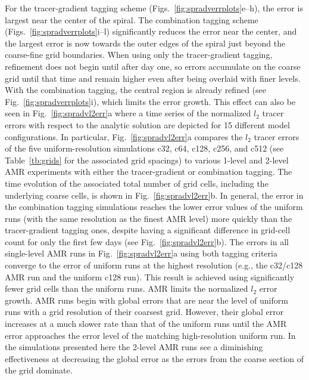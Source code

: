 %
For the tracer-gradient tagging scheme
(Figs.~\ref{fig:spradverrplots}e--h), the error is largest near the center of
the spiral. The combination tagging scheme
(Figs.~\ref{fig:spradverrplots}i--l) significantly reduces the error near the
center, and the largest error is now towards the outer edges of the
spiral just beyond the coarse-fine grid boundaries.  When using only the
tracer-gradient tagging, refinement does not begin until after day one,
so errors accumulate on the coarse grid until that time and remain
higher even after being overlaid with finer levels.  With the
combination tagging, the central region is already refined (see
Fig.~\ref{fig:spradverrplots}i), which limits the error growth.  This effect
can also be seen in
Fig.~\ref{fig:spradvl2err}a where a time series of the normalized $l_2$
tracer errors with respect to the analytic solution are depicted for 15
different model configurations.  In particular,
Fig.~\ref{fig:spradvl2err}a compares the $l_2$ tracer errors of the five
uniform-resolution simulations c32, c64, c128, c256, and c512 (see
Table~\ref{tb:grids} for the associated grid spacings) to various 1-level and
2-level AMR experiments with either the tracer-gradient or combination
tagging.  The time evolution of the associated total number of grid
cells, including the underlying coarse cells, is shown in
Fig.~\ref{fig:spradvl2err}b.  In general, the error in the combination
tagging simulations reaches the lower error values of the uniform runs
(with the same resolution as the finest AMR level) more quickly than the
tracer-gradient tagging ones, despite having a significant
difference in grid-cell count for only the first few days (see
Fig.~\ref{fig:spradvl2err}b).
The errors in all
single-level AMR runs in
Fig.~\ref{fig:spradvl2err}a using both tagging criteria converge to the error
of uniform runs at the highest resolution (e.g., the c32/c128 AMR run and
the uniform c128 run).  This result is achieved using significantly
fewer grid cells than the uniform runs.  AMR limits the normalized 
$l_2$ error growth.  AMR runs begin with global errors that are near the level 
of uniform runs with a grid resolution of their coarsest grid.
However, their global error increases at a much slower rate than that of
the uniform runs until the AMR error approaches the error level of the
matching high-resolution uniform run.  In the simulations presented here the 2-level AMR runs see a diminishing
effectiveness at decreasing the global error as the errors from the
coarse section of the grid dominate. 
%
